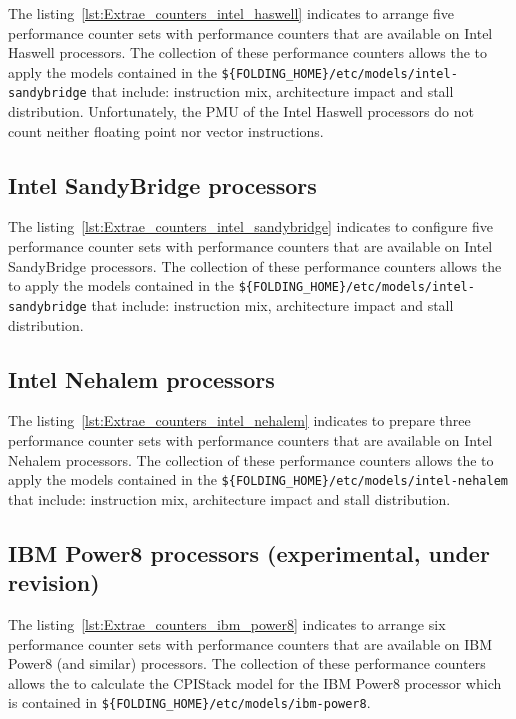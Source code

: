 

The listing~\ref{lst:Extrae_counters_intel_haswell} indicates \EXTRAE to arrange five performance counter sets with performance counters that are available on Intel Haswell processors.
The collection of these performance counters allows the \FOLDING to apply the models contained in the \texttt{\$\{FOLDING\_HOME\}/etc/models/intel-sandybridge} that include: instruction mix, architecture impact and stall distribution.
Unfortunately, the PMU of the Intel Haswell processors do not count neither floating point nor vector instructions.

\subsection{Intel SandyBridge processors}



The listing~\ref{lst:Extrae_counters_intel_sandybridge} indicates \EXTRAE to configure five performance counter sets with performance counters that are available on Intel SandyBridge processors.
The collection of these performance counters allows the \FOLDING to apply the models contained in the \texttt{\$\{FOLDING\_HOME\}/etc/models/intel-sandybridge} that include: instruction mix, architecture impact and stall distribution.

\subsection{Intel Nehalem processors}



The listing~\ref{lst:Extrae_counters_intel_nehalem} indicates \EXTRAE to prepare three performance counter sets with performance counters that are available on Intel Nehalem processors.
The collection of these performance counters allows the \FOLDING to apply the models contained in the \texttt{\$\{FOLDING\_HOME\}/etc/models/intel-nehalem} that include: instruction mix, architecture impact and stall distribution.

\subsection{IBM Power8 processors (experimental, under revision)}



The listing~\ref{lst:Extrae_counters_ibm_power8} indicates \EXTRAE to arrange six performance counter sets with performance counters that are available on IBM Power8 (and similar) processors.
The collection of these performance counters allows the \FOLDING to calculate the CPIStack model for the IBM Power8 processor which is contained in \texttt{\$\{FOLDING\_HOME\}/etc/models/ibm-power8}.


